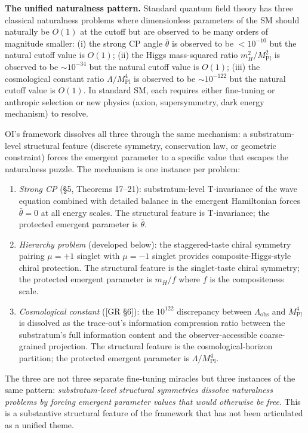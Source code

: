 \documentclass[
]{article}
\begin{document}
\textbf{The unified naturalness pattern.} Standard quantum field theory
has three classical naturalness problems where dimensionless parameters
of the SM should naturally be \(O(1)\) at the cutoff but are observed to
be many orders of magnitude smaller: (i) the strong CP angle
\(\bar\theta\) is observed to be \(< 10^{-10}\) but the natural cutoff
value is \(O(1)\); (ii) the Higgs mass-squared ratio
\(m_H^2/M_{\mathrm{Pl}}^2\) is observed to be \(\sim 10^{-34}\) but the
natural cutoff value is \(O(1)\); (iii) the cosmological constant ratio
\(\Lambda/M_{\mathrm{Pl}}^4\) is observed to be \(\sim 10^{-122}\) but
the natural cutoff value is \(O(1)\). In standard SM, each requires
either fine-tuning or anthropic selection or new physics (axion,
supersymmetry, dark energy mechanism) to resolve.

OI's framework dissolves all three through the same mechanism: a
substratum-level structural feature (discrete symmetry, conservation
law, or geometric constraint) forces the emergent parameter to a
specific value that escapes the naturalness puzzle. The mechanism is one
instance per problem:

\begin{enumerate}
\def\labelenumi{(\roman{enumi})}
\item
  \emph{Strong CP} (§5, Theorems 17--21): substratum-level T-invariance
  of the wave equation combined with detailed balance in the emergent
  Hamiltonian forces \(\bar\theta = 0\) at all energy scales. The
  structural feature is T-invariance; the protected emergent parameter
  is \(\bar\theta\).
\item
  \emph{Hierarchy problem} (developed below): the staggered-taste chiral
  symmetry pairing \(\mu = +1\) singlet with \(\mu = -1\) singlet
  provides composite-Higgs-style chiral protection. The structural
  feature is the singlet-taste chiral symmetry; the protected emergent
  parameter is \(m_H/f\) where \(f\) is the compositeness scale.
\item
  \emph{Cosmological constant} ({[}GR §6{]}): the \(10^{122}\)
  discrepancy between \(\Lambda_{\mathrm{obs}}\) and
  \(M_{\mathrm{Pl}}^4\) is dissolved as the trace-out's information
  compression ratio between the substratum's full information content
  and the observer-accessible coarse-grained projection. The structural
  feature is the cosmological-horizon partition; the protected emergent
  parameter is \(\Lambda/M_{\mathrm{Pl}}^4\).
\end{enumerate}

The three are not three separate fine-tuning miracles but three
instances of the same pattern: \emph{substratum-level structural
symmetries dissolve naturalness problems by forcing emergent parameter
values that would otherwise be free}. This is a substantive structural
feature of the framework that has not been articulated as a unified
theme.
\end{document}
